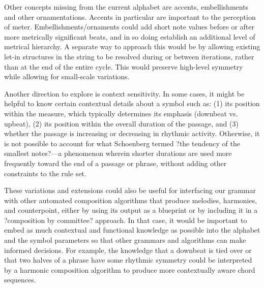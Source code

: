 \documentclass{article}
\begin{document}
Other concepts missing from the current alphabet are accents, embellishments and other ornamentations. Accents in particular are important to the perception of meter. Embellishments/ornaments could add short note values before or after more metrically significant beats, and in so doing establish an additional level of metrical hierarchy. A separate way to approach this would be by allowing existing let-in structures in the string to be resolved during or between iterations, rather than at the end of the entire cycle. This would preserve high-level symmetry while allowing for small-scale variations.


Another direction to explore is context sensitivity. In some cases, it might be helpful to know certain contextual details about a symbol such as: (1) its position within the measure, which typically determines its emphasis (downbeat vs. upbeat), (2) its position within the overall duration of the passage, and (3) whether the passage is increasing or decreasing in rhythmic activity. Otherwise, it is not possible to account for what Schoenberg termed ?the tendency of the smallest notes?\cite{schoenberg}---a phenomenon wherein shorter durations are used more frequently toward the end of a passage or phrase, without adding other constraints to the rule set.

These variations and extensions could also be useful for interfacing our grammar with other automated composition algorithms that produce melodies, harmonies, and \linebreak counterpoint, either by using its output as a blueprint or by including it in a ?composition by committee? approach. In that case, it would be important to embed as much contextual and functional knowledge as possible into the alphabet and the symbol parameters so that other grammars and algorithms can make informed decisions. For example, the knowledge that a downbeat is tied over or that two halves of a phrase have some rhythmic symmetry could be interpreted by a harmonic composition algorithm to produce more contextually aware chord sequences.


\end{document}
